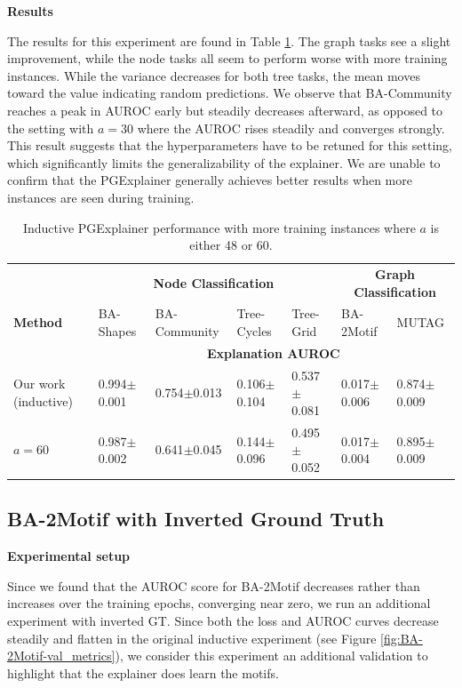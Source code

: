 \textbf{Results}\par
The results for this experiment are found in Table \ref{tab:experiment_60train}. The graph tasks see a slight improvement, while the node tasks all seem to perform worse with more training instances. While the variance decreases for both tree tasks, the mean moves toward the value indicating random predictions. We observe that BA-Community reaches a peak in AUROC early but steadily decreases afterward, as opposed to the setting with $a=30$ where the AUROC rises steadily and converges strongly. This result suggests that the hyperparameters have to be retuned for this setting, which significantly limits the generalizability of the explainer. We are unable to confirm that the PGExplainer generally achieves better results when more instances are seen during training.

\begin{table}[ht]
    \centering
    \scriptsize
    \begin{tabularx}{\textwidth}{l|XXXX|XX}   %
    \textbf{} & \multicolumn{4}{c}{\textbf{Node Classification}} & \multicolumn{2}{c}{\textbf{Graph Classification}} \\
    \textbf{Method} & BA-Shapes & BA-Community & Tree-Cycles & Tree-Grid & BA-2Motif & MUTAG \\
    \midrule
    \addlinespace
    \textbf{} & \multicolumn{6}{c}{\textbf{Explanation AUROC}} \\
    \midrule
    Our work (inductive) & 0.994$\pm$0.001 & 0.754$\pm$0.013 & 0.106$\pm$0.104 & 0.537$\pm$0.081 & 0.017$\pm$0.006 & 0.874$\pm$0.009 \\
    \midrule
    $a=60$ & 0.987$\pm$0.002 & 0.641$\pm$0.045 & 0.144$\pm$0.096 & 0.495$\pm$0.052 & 0.017$\pm$0.004 & 0.895$\pm$0.009 \\
    \bottomrule
    \end{tabularx}
    \caption[Inductive performance with more training instances]{Inductive PGExplainer performance with more training instances where $a$ is either 48 or 60.}
    \label{tab:experiment_60train}
\end{table}

\subsection{BA-2Motif with Inverted Ground Truth}
\label{sec:flipped_gt}

\textbf{Experimental setup}\par
Since we found that the AUROC score for BA-2Motif decreases rather than increases over the training epochs, converging near zero, we run an additional experiment with inverted  GT. Since both the loss and AUROC curves decrease steadily and flatten in the original inductive experiment (see Figure \ref{fig:BA-2Motif-val_metrics}), we consider this experiment an additional validation to highlight that the explainer does learn the motifs.

